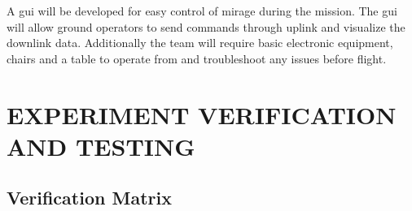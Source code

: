 \documentclass[
  a4paper,
  11pt,
  openany,
  parskip,
  toc=totoc,
  listof=totoc,
  bibliography=totoc
]{scrreprt}
\begin{document}
A \gls{gui} will be developed for easy control of \gls{mirage} during the mission. The \gls{gui} will allow ground operators to send commands through uplink and visualize the downlink data. Additionally the team will require basic electronic equipment, chairs and a table to operate from and troubleshoot any issues before flight.


\chapter{EXPERIMENT VERIFICATION AND TESTING}

\section{Verification Matrix}
\end{document}
